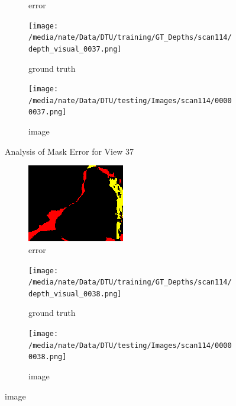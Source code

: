 \documentclass{article}
\begin{document}
\begin{figure}
\begin{subfigure}{0.3\textwidth}
		\caption{error}
		\label{fig:error37}
	\end{subfigure}
	\hfill
	\centering
	\begin{subfigure}{0.3\textwidth}
		\centering
		\texttt{[image: /media/nate/Data/DTU/training/GT\_Depths/scan114/depth\_visual\_0037.png]}
		\caption{ground truth}
		\label{fig:gt37}
	\end{subfigure}
	\hfill
	\centering
	\begin{subfigure}{0.3\textwidth}
		\centering
		\texttt{[image: /media/nate/Data/DTU/testing/Images/scan114/00000037.png]}
		\caption{image}
		\label{fig:img37}
	\end{subfigure}
	\hfill
	\caption{Analysis of Mask Error for View 37}
	\label{fig:error_analys37}
\end{figure}\begin{figure}
	\centering
	\begin{subfigure}{0.3\textwidth}
		\centering
		\includegraphics[width=\textwidth]{./output/038_error.png}
		\caption{error}
		\label{fig:error38}
	\end{subfigure}
	\hfill
	\centering
	\begin{subfigure}{0.3\textwidth}
		\centering
		\texttt{[image: /media/nate/Data/DTU/training/GT\_Depths/scan114/depth\_visual\_0038.png]}
		\caption{ground truth}
		\label{fig:gt38}
	\end{subfigure}
	\hfill
	\centering
	\begin{subfigure}{0.3\textwidth}
		\centering
		\texttt{[image: /media/nate/Data/DTU/testing/Images/scan114/00000038.png]}
		\caption{image}

\end{subfigure}
\end{figure}
\end{document}
